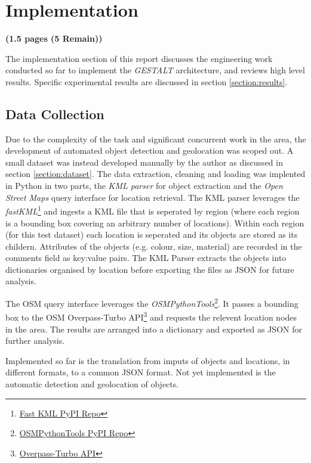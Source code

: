 \section{Implementation}
\label{section:implementation}
\textbf{(1.5 pages (5 Remain))}

The implementation section of this report discusses the engineering work conducted so far to implement the \textit{GESTALT} architecture, and reviews high level results. Specific experimental results are discussed in section \ref{section:results}.

\subsection{Data Collection}
Due to the complexity of the task and significant concurrent work in the area, the development of automated object detection and geolocation was scoped out. 
A small dataset was instead developed manually by the author as discussed in section \ref{section:dataset}. 
The data extraction, cleaning and loading was implented in Python in two parts, the \textit{KML parser} for object extraction and the \textit{Open Street Maps} query interface for location retrieval. 
The KML parser leverages the \textit{fastKML}\footnote{\href{https://pypi.org/project/fastkml/}{Fast KML PyPI Repo}} and ingests a KML file that is seperated by region (where each region is a bounding box covering an arbitrary number of locations). 
Within each region (for this test dataset) each location is seperated and its objects are stored as its childern. 
Attributes of the objects (e.g. colour, size, material) are recorded in the comments field as key:value pairs.
The KML Parser extracts the objects into dictionaries organised by location before exporting the files as JSON for future analysis. 

The OSM query interface leverages the \textit{OSMPythonTools}\footnote{\href{https://pypi.org/project/OSMPythonTools/}{OSMPythonTools PyPI Repo}}. It passes a bounding box to the OSM Overpass-Turbo API\footnote{\href{https://overpass-turbo.eu/}{Overpass-Turbo API}} and requests the relevent location nodes in the area. 
The results are arranged into a dictionary and exported as JSON for further analysis. 

Implemented so far is the translation from imputs of objects and locations, in different formats, to a common JSON format. Not yet implemented is the automatic detection and geolocation of objects. 

